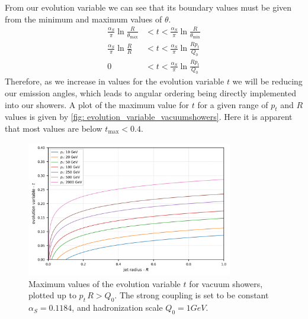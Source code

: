 \documentclass[main.tex]{subfiles}
\begin{document}
From our evolution variable we can see that its boundary values must be given from the minimum and maximum values of \(\theta\).
\begin{align}\label{eqn: evolution_parameter_boundaries}
    \frac{\alpha_S}{\pi} \ln \frac{R}{\theta_{\text{max}}} &< t < \frac{\alpha_S}{\pi} \ln \frac{R}{\theta_{\text{min}}} \nonumber \\
    \frac{\alpha_S}{\pi} \ln \frac{R}{R} &< t < \frac{\alpha_S}{\pi} \ln \frac{Rp_t}{Q_0}  \nonumber \\
    0 &< t < \frac{\alpha_S}{\pi} \ln \frac{Rp_t}{Q_0}
\end{align}
Therefore, as we increase in values for the evolution variable \(t\) we will be reducing our emission angles, which leads to angular ordering being directly implemented into our showers. A plot of the maximum value for \(t\) for a given range of \(p_t\) and \(R\) values is given by
\autoref{fig: evolution_variable_vacuumshowers}. Here it is apparent that most values are below \(t_{\text{max}} < 0.4\).
\begin{figure}[htb]
    \centering
    \includegraphics[width=9cm]{pictures/plots/misc/evolution_variable_vacuumshowers.png}
    \caption{Maximum values of the evolution variable \(t\) for vacuum showers, plotted up to \(p_t\,R > Q_0\). The strong coupling is set to be constant \(\alpha_S = 0.1184\), and hadronization scale \(Q_0 = 1 GeV\).}
    \label{fig: evolution_variable_vacuumshowers}
\end{figure}
\end{document}
